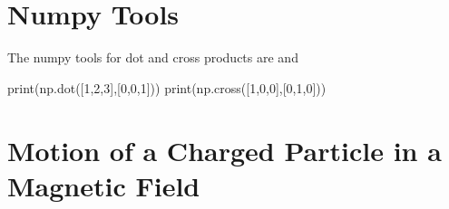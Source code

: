 \section{Numpy Tools}

The numpy tools for dot and cross products are  and 
\begin{python}
print(np.dot([1,2,3],[0,0,1]))
print(np.cross([1,0,0],[0,1,0]))
\end{python}

\section{Motion of a Charged Particle in a Magnetic Field}

